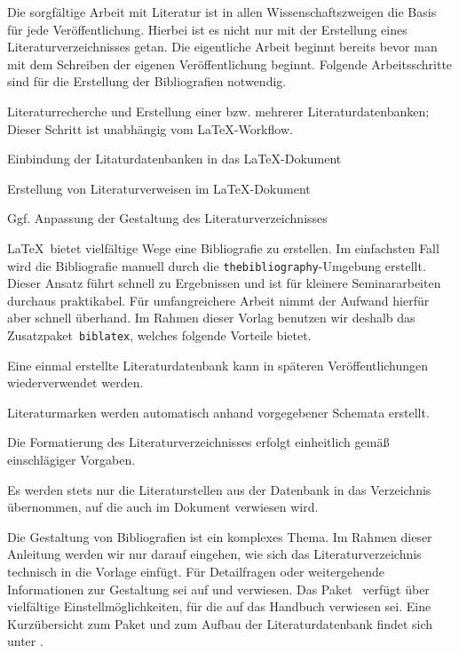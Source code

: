 Die sorgfältige Arbeit mit Literatur ist in allen Wissenschaftszweigen die
Basis für jede Veröffentlichung. Hierbei ist es nicht nur mit der Erstellung
eines Literaturverzeichnisses getan. Die eigentliche Arbeit beginnt bereits
bevor man mit dem Schreiben der eigenen Veröffentlichung beginnt. Folgende
Arbeitsschritte sind für die Erstellung der Bibliografien notwendig.
%
\begin{compactenum}
\item Literaturrecherche und Erstellung einer bzw. mehrerer
      Literaturdatenbanken; Dieser Schritt ist unabhängig vom \LaTeX-Workflow.
\item Einbindung der Litaturdatenbanken in das \LaTeX-Dokument
\item Erstellung von Literaturverweisen im \LaTeX-Dokument
\item Ggf. Anpassung der Gestaltung des Literaturverzeichnisses
\end{compactenum}

\LaTeX\ bietet vielfältige Wege eine Bibliografie zu erstellen. Im einfachsten
Fall wird die Bibliografie manuell durch die \texttt{thebibliography}-Umgebung
erstellt. Dieser Ansatz führt schnell zu Ergebnissen und ist für kleinere
Seminararbeiten durchaus praktikabel. Für umfangreichere Arbeit nimmt der
Aufwand hierfür aber schnell überhand. Im Rahmen dieser Vorlag benutzen wir
deshalb das Zusatzpaket~\texttt{biblatex}, welches folgende Vorteile bietet.
%
\begin{compactitem}
\item Eine einmal erstellte Literaturdatenbank kann in späteren
      Veröffentlichungen wiederverwendet werden.
\item Literaturmarken werden automatisch anhand vorgegebener Schemata erstellt.
\item Die Formatierung des Literaturverzeichnisses erfolgt einheitlich gemäß
      einschlägiger Vorgaben.
\item Es werden stets nur die Literaturstellen aus der Datenbank in das
      Verzeichnis übernommen, auf die auch im Dokument verwiesen wird.
\end{compactitem}

Die Gestaltung von Bibliografien ist ein komplexes Thema. Im Rahmen dieser
Anleitung werden wir nur darauf eingehen, wie sich das Literaturverzeichnis
technisch in die Vorlage einfügt. Für Detailfragen oder weitergehende
Informationen zur Gestaltung sei auf \cite{voss_bibliografien} und
\cite[Kapitel~13]{voss_wissenschaftliche_arbeit} verwiesen. Das
Paket~ verfügt über vielfältige Einstellmöglichkeiten, für
die auf das Handbuch verwiesen sei. Eine Kurzübersicht zum Paket und zum Aufbau
der Literaturdatenbank findet sich unter \cite{rees_biblatex_cheat}.
